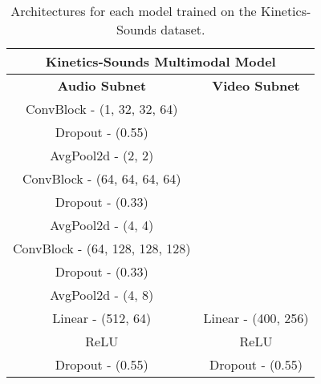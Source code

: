 \begin{table}[h!]
\footnotesize
    \caption{Architectures for each model trained on the Kinetics-Sounds dataset.}    \centering
    \begin{minipage}[t]{0.44\textwidth}
    \centering
    \vspace{0pt} %
    \begin{tabular}{clllllclllll}
        \hline
        \multicolumn{12}{c}{\textbf{Kinetics-Sounds Multimodal Model}}                                   \\ \hline
        \multicolumn{6}{c|}{\textbf{Audio Subnet}}           & \multicolumn{6}{c}{\textbf{Video Subnet}} \\ \hline
        \multicolumn{6}{c|}{ConvBlock - (1, 32, 32, 64)}     & \multicolumn{6}{c}{\multirow{9}{*}{}}     \\ \cline{1-6}
        \multicolumn{6}{c|}{Dropout - (0.55)}                & \multicolumn{6}{c}{}                      \\ \cline{1-6}
        \multicolumn{6}{c|}{AvgPool2d - (2, 2)}              & \multicolumn{6}{c}{}                      \\ \cline{1-6}
        \multicolumn{6}{c|}{ConvBlock - (64, 64, 64, 64)}    & \multicolumn{6}{c}{}                      \\ \cline{1-6}
        \multicolumn{6}{c|}{Dropout - (0.33)}                & \multicolumn{6}{c}{}                      \\ \cline{1-6}
        \multicolumn{6}{c|}{AvgPool2d - (4, 4)}              & \multicolumn{6}{c}{}                      \\ \cline{1-6}
        \multicolumn{6}{c|}{ConvBlock - (64, 128, 128, 128)} & \multicolumn{6}{c}{}                      \\ \cline{1-6}
        \multicolumn{6}{c|}{Dropout - (0.33)}                & \multicolumn{6}{c}{}                      \\ \cline{1-6}
        \multicolumn{6}{c|}{AvgPool2d - (4, 8)}              & \multicolumn{6}{c}{}                      \\ \hline
        \multicolumn{6}{c|}{Linear - (512, 64)}              & \multicolumn{6}{c}{Linear - (400, 256)}   \\ \hline
        \multicolumn{6}{c|}{ReLU}                            & \multicolumn{6}{c}{ReLU}                  \\ \hline
        \multicolumn{6}{c|}{Dropout - (0.55)}                & \multicolumn{6}{c}{Dropout - (0.55)}      \\ \hline

\end{tabular}
\end{minipage}
\end{table}
